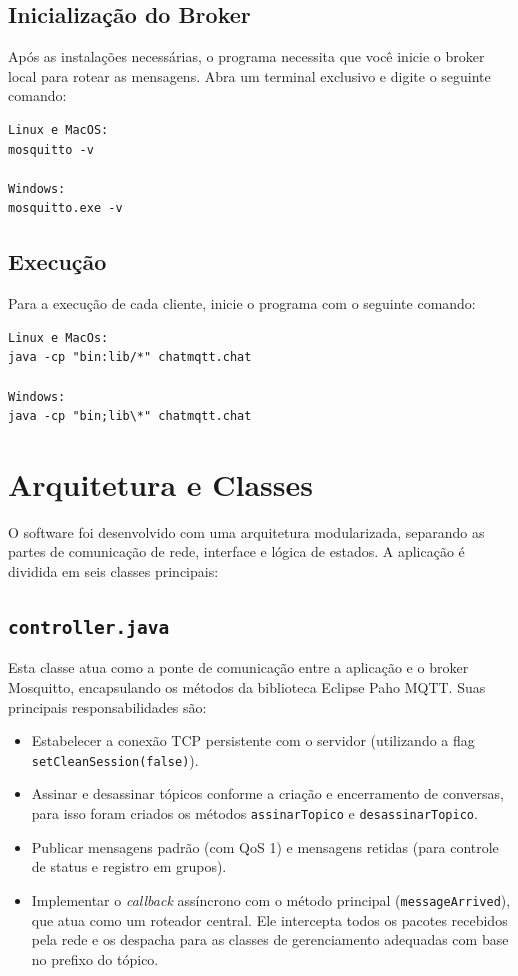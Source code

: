 \documentclass{report}
\begin{document}
\section{Inicialização do Broker}
Após as instalações necessárias, o programa necessita que você inicie o broker local para rotear as mensagens. Abra um terminal exclusivo e digite o seguinte comando:

\begin{verbatim}
Linux e MacOS:
mosquitto -v

Windows:
mosquitto.exe -v
\end{verbatim}

\section{Execução}
Para a execução de cada cliente, inicie o programa com o seguinte comando:
\begin{verbatim}
Linux e MacOs:
java -cp "bin:lib/*" chatmqtt.chat

Windows: 
java -cp "bin;lib\*" chatmqtt.chat
\end{verbatim}

\chapter{Arquitetura e Classes}
O software foi desenvolvido com uma arquitetura modularizada, separando as partes de comunicação de rede, interface e lógica de estados. A aplicação é dividida em seis classes principais:

\section{\texttt{controller.java}}
Esta classe atua como a ponte de comunicação entre a aplicação e o broker Mosquitto, encapsulando os métodos da biblioteca Eclipse Paho MQTT. Suas principais responsabilidades são:
\begin{itemize}
    \item Estabelecer a conexão TCP persistente com o servidor (utilizando a flag \texttt{setCleanSession(false)}).
    \item Assinar e desassinar tópicos conforme a criação e encerramento de conversas, para isso foram criados os métodos \texttt{assinarTopico} e \texttt{desassinarTopico}.
    \item Publicar mensagens padrão (com QoS 1) e mensagens retidas (para controle de status e registro em grupos).
    \item Implementar o \textit{callback} assíncrono com o método principal (\texttt{messageArrived}), que atua como um roteador central. Ele intercepta todos os pacotes recebidos pela rede e os despacha para as classes de gerenciamento adequadas com base no prefixo do tópico.
\end{itemize}
\end{document}
